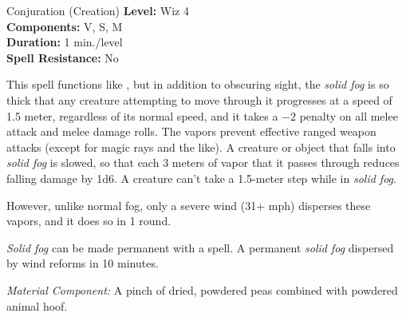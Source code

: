 {Conjuration (Creation)}
{
	\textbf{Level:}
	Wiz 4\\
	\textbf{Components:}
	V, S, M\\
	\textbf{Duration:}
	1 min./level\\
	\textbf{Spell Resistance:}
	No\\
}
{
	This spell functions like , but in addition to obscuring sight, the \emph{solid fog} is so thick that any creature attempting to move through it progresses at a speed of 1.5 meter, regardless of its normal speed, and it takes a $-2$ penalty on all melee attack and melee damage rolls. The vapors prevent effective ranged weapon attacks (except for magic rays and the like). A creature or object that falls into \emph{solid fog} is slowed, so that each 3 meters of vapor that it passes through reduces falling damage by 1d6. A creature can't take a 1.5-meter step while in \emph{solid fog}.

	However, unlike normal fog, only a severe wind (31+ mph) disperses these vapors, and it does so in 1 round.

	\emph{Solid fog} can be made permanent with a  spell. A permanent \emph{solid fog} dispersed by wind reforms in 10 minutes.

	\textit{Material Component:}
	A pinch of dried, powdered peas combined with powdered animal hoof.

}
